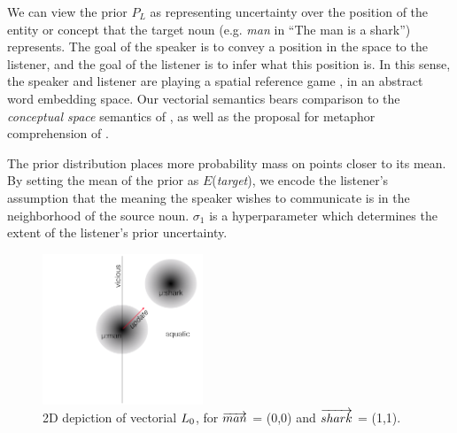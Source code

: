 \documentclass[9pt,twocolumn,twoside,lineno]{pnas-new}
\begin{document}
		We can view the prior $P_L$ as representing uncertainty over the position of the entity or concept that the target noun (e.g. \emph{man} in ``The man is a shark'') represents.
		The goal of the speaker is to convey a position in the space 
		to the listener, and the goal of the listener is to infer what this position is. In this sense, the speaker and listener are playing a spatial reference game  \cite{golland2010game}, in an abstract word embedding space. Our vectorial semantics bears comparison to the \emph{conceptual space} semantics of \cite{gardenfors2004conceptual}, as well as the proposal for metaphor comprehension of \cite{kintsch2000metaphor}.

		
		

		The prior distribution places more probability mass on points closer to its mean. By setting the mean of the prior as $E$(\emph{target}), we encode the listener's assumption that the meaning the speaker wishes to communicate is in the neighborhood of the source noun. $\sigma_1$ is a hyperparameter which determines the extent of the listener's prior uncertainty.

		\begin{figure}[htbp]
		\centering
		\includegraphics[height=4.5cm]{images/diagram1.png}
		   
		  \caption{2D depiction of vectorial $L\protect_0$, for $\protect\overrightarrow{man}$ = (0,0) and $\protect\overrightarrow{shark}$ = (1,1).}
		  \label{fig:2d}
		\end{figure}

\end{document}
